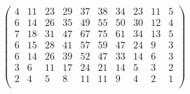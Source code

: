 \documentclass[aspectratio=169]{beamer}
\begin{document}
\begin{frame}
\begin{columns}
\begin{column}{0.5\textwidth}
\begin{alertblock}
\begin{footnotesize}
\begin{equation*}
\begin{pmatrix}
                4 & 11 & 23 & 29 & 37 & 38 & 34 & 23 & 11 &  5 \\
                6 & 14 & 26 & 35 & 49 & 55 & 50 & 30 & 12 &  4 \\
                7 & 18 & 31 & 47 & 67 & 75 & 61 & 34 & 13 &  5 \\
                6 & 15 & 28 & 41 & 57 & 59 & 47 & 24 &  9 &  3 \\
                6 & 14 & 26 & 39 & 52 & 47 & 33 & 14 &  6 &  3 \\
                3 &  6 & 11 & 17 & 24 & 21 & 14 &  5 &  3 &  2 \\
                2 &  4 &  5 &  8 & 11 & 11 &  9 &  4 &  2 &  1 \\
            \end{pmatrix}
        \end{equation*}
        \end{footnotesize}
    \end{alertblock}
    \end{column}
    \end{columns}
\end{frame}
\end{document}
